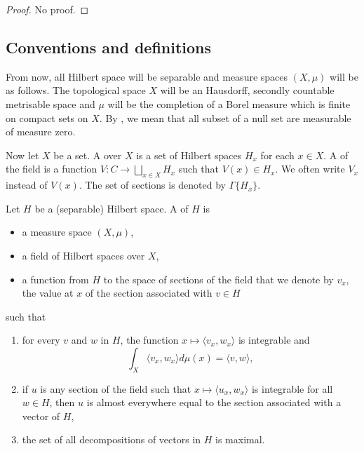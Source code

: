 \begin{proof}
No proof.
\end{proof}

					\subsection{Conventions and definitions}

From now, all Hilbert space will be separable and measure spaces $(X,\mu)$ will be as follows. The topological space $X$ will be an Hausdorff, secondly countable metrisable space and $\mu$ will be the completion of a Borel measure which is finite on compact sets on $X$. By , we mean that all subset of a null set are measurable of measure zero.

Now let $X$ be a set. A  over $X$ is a set of Hilbert spaces $H_x$ for each $x\in X$. A  of the field is a function $V\colon C\to \bigsqcup_{x\in X}H_x$ such that $V(x)\in H_x$. We often write $V_x$ instead of $V(x)$. The set of sections is denoted by $\Gamma\{ H_x \}$.

Let $H$ be a (separable) Hilbert space. A  of $H$ is
\begin{itemize}
	\item a measure space $(X,\mu)$,
	\item a field of Hilbert spaces over $X$,
	\item a function from $H$ to the space of sections of the field that we denote by $v_x$, the value at $x$ of the section associated with $v\in H$
\end{itemize}
such that
\begin{enumerate}
	\item for every $v$ and $w$ in $H$, the function $x\mapsto\langle v_x, w_x\rangle $ is integrable and
	\begin{equation}
		\int_X\langle v_x, w_x\rangle d\mu(x)=\langle v, w\rangle ,
	\end{equation}
	\item if $u$ is any section of the field such that $x\mapsto\langle u_x, w_x\rangle $ is integrable for all $w\in H$, then $u$ is almost everywhere equal to the section associated with a vector of $H$,
	\item the set of all decompositions of vectors in $H$ is maximal.
\end{enumerate}

